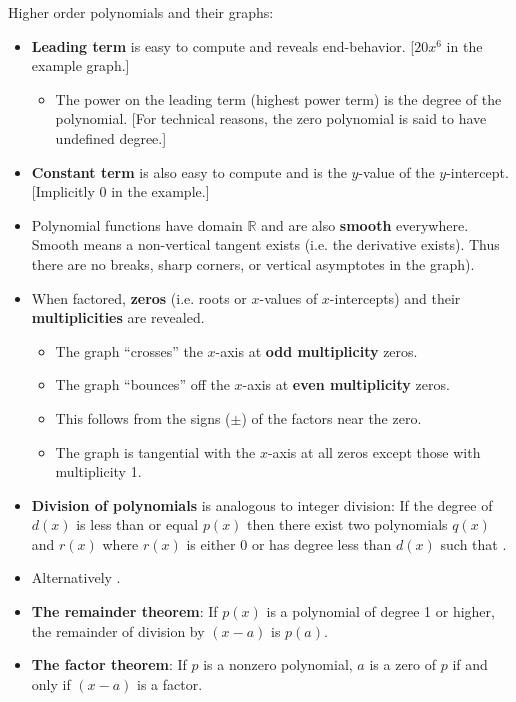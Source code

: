 \documentclass{amsbook}
\numberwithin{section}{chapter}
\numberwithin{equation}{chapter}
\newcommand{\qi}[1]{\begin{itemize}\item #1 \end{itemize}}
\newcommand{\R}{\mathbb{R}}
\begin{document}
\bigskip
Higher order polynomials and their graphs:
\begin{itemize}
	\item \textbf{Leading term} is easy to compute and reveals end-behavior. [$20x^6$ in the example graph.]
	\qi{The power on the leading term (highest power term) is the degree of the polynomial. [For technical reasons, the zero polynomial is said to have undefined degree.]}
	\item \textbf{Constant term} is also easy to compute and is the $y$-value of the $y$-intercept. [Implicitly 0 in the example.]
	\item Polynomial functions have domain $\R$ and are also \textbf{smooth} everywhere. Smooth means a non-vertical tangent exists (i.e. the derivative exists). Thus there are no breaks, sharp corners, or vertical asymptotes in the graph).
	\item When factored, \textbf{zeros} (i.e. roots or $x$-values of $x$-intercepts) and their \textbf{multiplicities} are revealed.
	\begin{itemize}
		\item The graph ``crosses'' the $x$-axis at \textbf{odd multiplicity} zeros.
		\item The graph ``bounces'' off the $x$-axis at \textbf{even multiplicity} zeros.
		\item This follows from the signs ($\pm$) of the factors near the zero.
		\item The graph is tangential with the $x$-axis at all zeros except those with multiplicity 1.
	\end{itemize}
 \item \textbf{Division of polynomials} is analogous to integer division: If the degree of $d(x)$ is less than or equal $p(x)$ then there exist two polynomials $q(x)$ and $r(x)$ where $r(x)$ is either 0 or has degree less than $d(x)$ such that .
 \item Alternatively .
 \item \textbf{The remainder theorem}: If $p(x)$ is a polynomial of degree 1 or higher, the remainder of division by $(x-a)$ is $p(a)$.
 \item \textbf{The factor theorem}: If $p$ is a nonzero polynomial, $a$ is a zero of $p$ if and only if $(x-a)$ is a factor.
\end{itemize}
\end{document}
